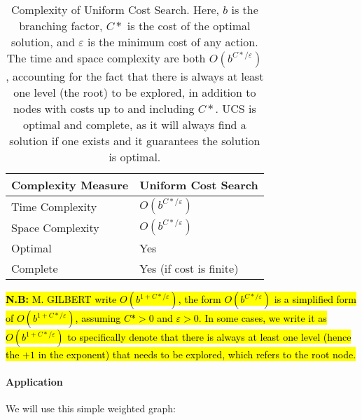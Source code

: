 \documentclass[a4paper,UKenglish,cleveref, autoref, thm-restate]{qlinhta}
\begin{document}
    \begin{table}[H]
        \centering
        \begin{tabular}{|l|l|}
            \hline
            \textbf{Complexity Measure} & \textbf{Uniform Cost Search} \\
            \hline
            Time Complexity             & $O(b^{C*/\varepsilon})$      \\
            \hline
            Space Complexity            & $O(b^{C*/\varepsilon})$      \\
            \hline
            Optimal                     & Yes                          \\
            \hline
            Complete                    & Yes (if cost is finite)      \\
            \hline
        \end{tabular}
        \caption{Complexity of Uniform Cost Search. Here, $b$ is the branching factor, $C*$ is the cost of the optimal solution, and $\varepsilon$ is the minimum cost of any action. The time and space complexity are both $O(b^{C*/\varepsilon})$, accounting for the fact that there is always at least one level (the root) to be explored, in addition to nodes with costs up to and including $C*$. UCS is optimal and complete, as it will always find a solution if one exists and it guarantees the solution is optimal.}
        \label{tab:ucs_complexity_detailed}
    \end{table}

    \hl{\textbf{N.B:} M. GILBERT write $O(b^{1 + C*/\varepsilon})$, the form $O(b^{C*/\varepsilon})$ is a simplified form of $O(b^{1 + C*/\varepsilon})$, assuming $C* > 0$ and $\varepsilon > 0$. In some cases, we write it as $O(b^{1 + C*/\varepsilon})$ to specifically denote that there is always at least one level (hence the $+1$ in the exponent) that needs to be explored, which refers to the root node.}

    \paragraph*{Application}
    We will use this simple weighted graph:

    \begin{center}
    \end{center}
\end{document}
